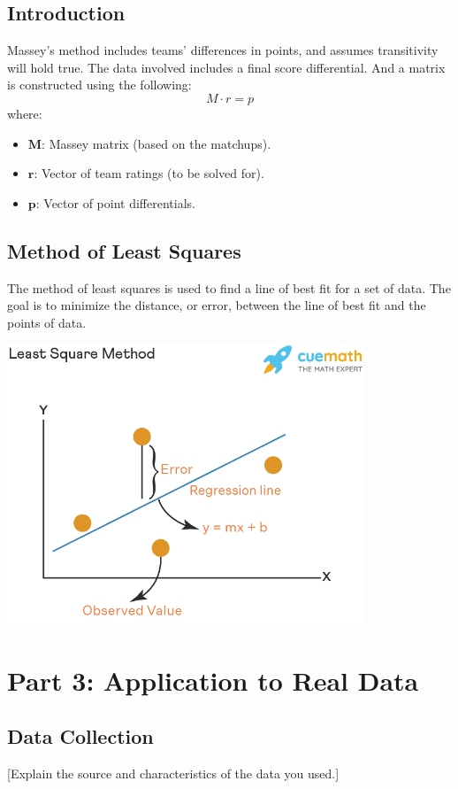 \documentclass[12pt]{article}
\begin{document}
\subsection{Introduction}
Massey's method includes teams' differences in points, and assumes transitivity 
will hold true. The data involved includes a final score differential. And 
a matrix is constructed using the following: 
\newpage
\[
M \cdot r = p
\]
where:
\begin{itemize}
    \item \(\mathbf{M}\): Massey matrix (based on the matchups).
    \item \(\mathbf{r}\): Vector of team ratings (to be solved for).
    \item \(\mathbf{p}\): Vector of point differentials.
\end{itemize}


\subsection{Method of Least Squares}
The method of least squares is used to find a line of best fit for a set of data. 
The goal is to minimize the distance, or error, between the line of best fit 
and the points of data.

\begin{center}
    \includegraphics[width=0.8\textwidth]{least-square-method-1-1650276785.png}
    \end{center}


\section{Part 3: Application to Real Data}
\subsection{Data Collection}
[Explain the source and characteristics of the data you used.]
\end{document}
